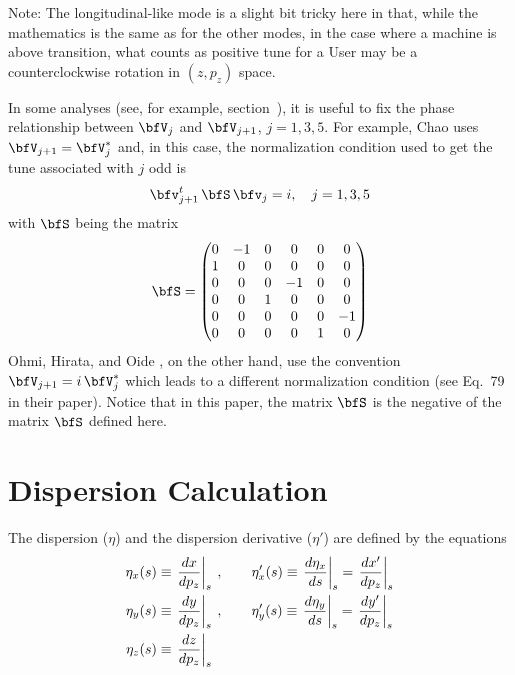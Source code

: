 Note: The longitudinal-like mode is a slight bit tricky here in that, while the mathematics is the
same as for the other modes, in the case where a machine is above transition, what counts as
positive tune for a User may be a counterclockwise rotation in $(z, p_z)$ space.

In some analyses (see, for example, section~), it is useful to fix the phase
relationship between $\bfV_j$ and $\bfV_{j+1}$, $j = 1, 3, 5$. For example, Chao \cite{b:chao79}
uses $\bfV_{j+1} = \bfV_j^*$ and, in this case, the normalization condition used to get the tune
associated with $j$ odd is
\begin{equation}
  \bfv_{j+1}^{t} \, \bfS \, \bfv_j = i, \quad j = 1, 3, 5
  \label{vsvi0}
\end{equation}
with $\bfS$ being the matrix
\begin{equation}
  \bfS = \begin{pmatrix}
      0 & -1 &  0 &  0 &  0 &  0 \\
      1 &  0 &  0 &  0 &  0 &  0 \\
      0 &  0 &  0 & -1 &  0 &  0 \\
      0 &  0 &  1 &  0 &  0 &  0 \\
      0 &  0 &  0 &  0 &  0 & -1 \\
      0 &  0 &  0 &  0 &  1 &  0 \\
  \end{pmatrix}
\end{equation}
Ohmi, Hirata, and Oide \cite{b:ohmi}, on the other hand, use the convention $\bfV_{j+1} = i \,
\bfV_j^*$ which leads to a different normalization condition (see Eq.~79 in their paper). Notice
that in this paper, the matrix $\bfS$ is the negative of the matrix $\bfS$ defined here.

\section{Dispersion Calculation}
\label{s:dispersion}

The dispersion ($\eta$) and the dispersion derivative ($\eta'$) are defined by the equations
\begin{align}
  \eta_x(s) &\equiv \left. \frac{dx}{dp_z} \right|_s \> , \qquad
    \eta'_x(s) \equiv \left. \frac{d\eta_x}{ds} \right|_s
    = \left. \frac{dx'}{dp_z} \right|_s \nonumber \\
  \eta_y(s) &\equiv \left. \frac{dy}{dp_z} \right|_s \> , \qquad
    \eta'_y(s) \equiv \left. \frac{d\eta_y}{ds} \right|_s
    = \left. \frac{dy'}{dp_z} \right|_s \\
  \eta_z(s) &\equiv \left. \frac{dz}{dp_z} \right|_s \nonumber
\end{align}

